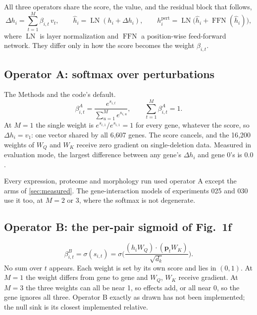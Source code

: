 All three operators share the score, the value, and the residual block that follows,
\begin{equation}
\Delta h_i=\sum_{t=1}^{M}\beta_{i,t}\,v_t,\qquad
\hat h_i=\operatorname{LN}(h_i+\Delta h_i),\qquad
h_i^{\mathrm{pert}}=\operatorname{LN}\!\big(\hat h_i+\operatorname{FFN}(\hat h_i)\big),
\label{eq:block}
\end{equation}
where $\operatorname{LN}$ is layer normalization and $\operatorname{FFN}$ a position-wise
feed-forward network. They differ only in how the score becomes the weight $\beta_{i,t}$.

\subsection{Operator A: softmax over perturbations}

The Methods and the code's default.
\begin{equation}
\beta^{A}_{i,t}=\frac{e^{s_{i,t}}}{\sum_{u=1}^{M}e^{s_{i,u}}},\qquad
\sum_{t=1}^{M}\beta^{A}_{i,t}=1 .
\label{eq:softmax}
\end{equation}
At $M=1$ the single weight is $e^{s_{i,1}}/e^{s_{i,1}}=1$ for every gene, whatever the
score, so $\Delta h_i=v_1$: one vector shared by all 6{,}607 genes. The score cancels, and
the 16{,}200 weights of $W_Q$ and $W_K$ receive zero gradient on single-deletion data.
Measured in evaluation mode, the largest difference between any gene's $\Delta h_i$ and
gene 0's is $0.0$.

Every expression, proteome and morphology run used operator A except the arms of
\cref{sec:measured}. The gene-interaction models of experiments 025 and 030 use it too,
at $M=2$ or $3$, where the softmax is not degenerate.

\subsection{Operator B: the per-pair sigmoid of Fig.~1f}

\begin{equation}
\beta^{B}_{i,t}=\sigma(s_{i,t})
=\sigma\!\Big(\frac{(h_iW_Q)\cdot(\mathbf{p}_tW_K)}{\sqrt{d_k}}\Big).
\label{eq:sigmoid}
\end{equation}
No sum over $t$ appears. Each weight is set by its own score and lies in $(0,1)$. At $M=1$
the weight differs from gene to gene and $W_Q$, $W_K$ receive gradient. At $M=3$ the three
weights can all be near 1, so effects add, or all near 0, so the gene ignores all three.
Operator B exactly as drawn has not been implemented; the null sink is its closest
implemented relative.

